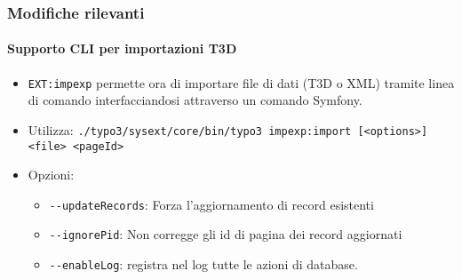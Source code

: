 \begin{frame}[fragile]
	\frametitle{Modifiche rilevanti}
	\framesubtitle{Supporto CLI per importazioni T3D}

	\begin{itemize}
		\item \texttt{EXT:impexp} permette ora di importare file di dati (T3D o XML) tramite linea di comando
			interfacciandosi attraverso un comando Symfony.

		\item Utilizza:\newline
			\smaller
				\texttt{./typo3/sysext/core/bin/typo3 impexp:import [<options>] <file> <pageId>}
			\normalsize

		\item Opzioni:
			\begin{itemize}
				\item \texttt{-}\texttt{-updateRecords}: Forza l'aggiornamento di record esistenti
				\item \texttt{-}\texttt{-ignorePid}: Non corregge gli id di pagina dei record aggiornati
				\item \texttt{-}\texttt{-enableLog}: registra nel log tutte le azioni di database.
			\end{itemize}

	\end{itemize}

\end{frame}


